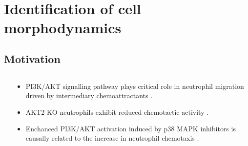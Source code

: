 \documentclass[12pt]{beamer}
\begin{document}
\section{Identification of cell morphodynamics}
\subsection{Motivation}
\begin{frame}
\begin{columns}
	\begin{column}{0.4\textwidth}
		\centering
	\end{column}
	\begin{column}{0.6\textwidth}
\begin{itemize}
	\item PI3K/AKT signalling pathway plays critical role in neutrophil migration driven by intermediary chemoattractants \cite{Zhang2013}.
	\item AKT2 KO neutrophils exhibit reduced chemotactic activity \cite{Chen2010}.
	\item Enchanced PI3K/AKT activation induced by p38 MAPK inhibitors is causally related to the increase in neutrophil chemotaxis \cite{Heit2002}.
\end{itemize}	
	\end{column}
\end{columns}
\end{frame}
\end{document}

